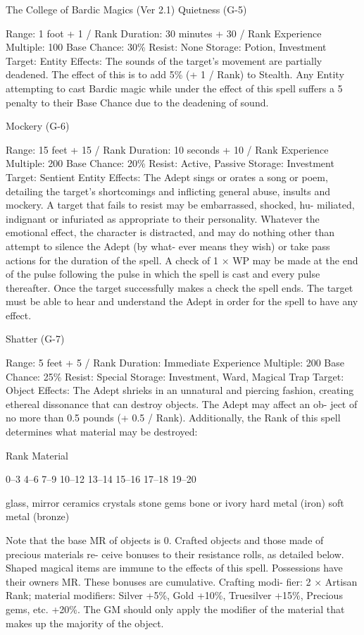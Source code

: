 \begin{Chapter}{The College of Bardic Magics (Ver 2.1)}
Quietness (G-5) 

Range: 1 foot + 1 / Rank 
Duration: 30 minutes + 30 / Rank 
Experience Multiple: 100 
Base Chance: 30\% 
Resist: None 
Storage: Potion, Investment 
Target: Entity 
Effects:  The  sounds  of  the  target’s  movement  are 
partially deadened. The effect of this is to add 5\% 
(+  1  /  Rank)  to  Stealth.  Any  Entity  attempting  to 
cast  Bardic  magic  while  under  the  effect  of  this 
spell  suffers  a  5  penalty  to  their  Base  Chance  due 
to the deadening of sound. 

Mockery (G-6) 

Range: 15 feet + 15 / Rank 
Duration: 10 seconds + 10 / Rank 
Experience Multiple: 200 
Base Chance: 20\% 
Resist: Active, Passive 
Storage: Investment 
Target: Sentient Entity 
Effects: The Adept sings or orates a song or poem, 
detailing  the  target’s  shortcomings  and  inflicting 
general  abuse,  insults  and  mockery.  A  target  that 
fails  to  resist  may  be  embarrassed,  shocked,  hu-
miliated,  indignant  or  infuriated  as  appropriate  to 
their  personality.  Whatever  the  emotional  effect, 
the  character  is  distracted,  and  may  do  nothing 
other  than  attempt  to  silence  the  Adept  (by  what-
ever means they  wish) or take pass actions for the 
duration  of  the  spell.  A  check  of  1  ×  WP  may  be 
made at the end of the pulse following the pulse in 
which  the  spell  is  cast  and  every  pulse  thereafter. 
Once  the  target  successfully  makes  a  check  the 
spell  ends.  The  target  must  be  able  to  hear  and 
understand the Adept in order for the spell to have 
any effect. 

Shatter (G-7) 

Range: 5 feet + 5 / Rank 
Duration: Immediate 
Experience Multiple: 200 
Base Chance: 25\% 
Resist: Special 
Storage: Investment, Ward, Magical Trap 
Target: Object 
Effects:  The  Adept  shrieks  in  an  unnatural  and 
piercing  fashion,  creating  ethereal  dissonance  that 
can  destroy  objects.  The  Adept  may  affect  an  ob-
ject  of  no  more  than  0.5  pounds  (+  0.5  /  Rank). 
Additionally,  the  Rank  of  this  spell  determines 
what material may be destroyed: 

Rank  Material 

0–3 
4–6 
7–9 
10–12 
13–14 
15–16 
17–18 
19–20 

glass, mirror 
ceramics 
crystals 
stone 
gems 
bone or ivory 
hard metal (iron) 
soft metal (bronze) 

Note  that  the  base  MR  of  objects  is  0.  Crafted 
objects  and  those  made  of  precious  materials  re-
ceive  bonuses  to  their  resistance  rolls,  as  detailed 
below.  Shaped  magical  items  are  immune  to  the 
effects of this spell. Possessions have their owners 
MR. These bonuses are cumulative. Crafting modi-
fier:  2  ×  Artisan  Rank;  material  modifiers:  Silver 
+5\%,  Gold  +10\%,  Truesilver  +15\%,  Precious 
gems,  etc.  +20\%.  The  GM  should  only  apply  the 
modifier of the material that makes up the majority 
of the object. 


\end{Chapter}
